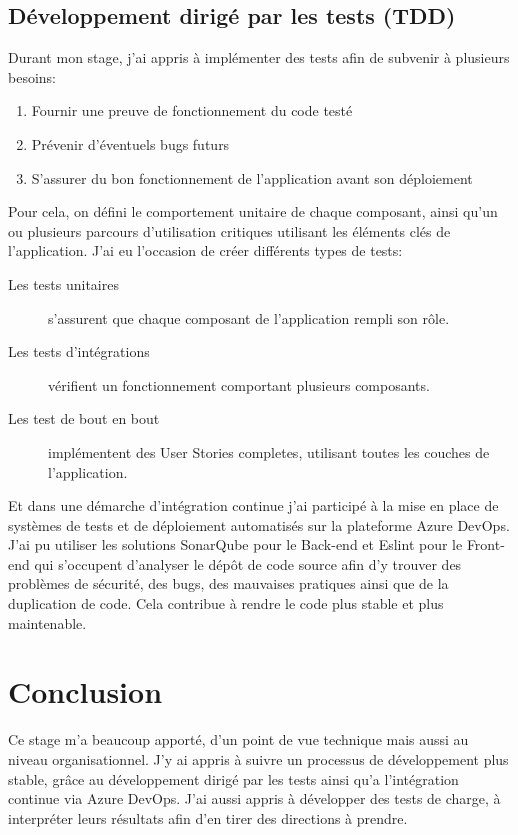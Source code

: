 \documentclass[12pt, a4paper]{report}
\begin{document}
        \section{Développement dirigé par les tests (TDD)}
            Durant mon stage, j'ai appris à implémenter des tests afin de subvenir à plusieurs besoins\@:
            \begin{enumerate}
                \item Fournir une preuve de fonctionnement du code testé
                \item Prévenir d'éventuels bugs futurs
                \item S'assurer du bon fonctionnement de l'application avant son déploiement
            \end{enumerate}
            Pour cela, on défini le comportement unitaire de chaque composant, ainsi qu'un ou plusieurs parcours d'utilisation critiques utilisant les éléments clés de l'application.\newline
            J'ai eu l'occasion de créer différents types de tests\@:
            \begin{description}
                \item [Les tests unitaires] s'assurent que chaque composant de l'application rempli son rôle.
                \item [Les tests d'intégrations] vérifient un fonctionnement comportant plusieurs composants.
                \item [Les test de bout en bout] implémentent des User Stories completes, utilisant toutes les couches de l'application.
            \end{description}
            Et dans une démarche d'intégration continue j'ai participé à la mise en place de systèmes de tests et de déploiement automatisés sur la plateforme Azure DevOps.\newline
            J'ai pu utiliser les solutions SonarQube pour le Back-end et Eslint pour le Front-end qui s'occupent d'analyser le dépôt de code source afin d'y trouver des problèmes de sécurité, des bugs, des mauvaises pratiques ainsi que de la duplication de code.\newline
            Cela contribue à rendre le code plus stable et plus maintenable.\newline
    \chapter{Conclusion}
        Ce stage m'a beaucoup apporté, d'un point de vue technique mais aussi au niveau organisationnel.\newline
        J'y ai appris à suivre un processus de développement plus stable, grâce au développement dirigé par les tests ainsi qu'a l'intégration continue via Azure DevOps.\newline
        J'ai aussi appris à développer des tests de charge, à interpréter leurs résultats afin d'en tirer des directions à prendre.\newline
    \makeutbmbackcover{}
    \appendix
\end{document}
